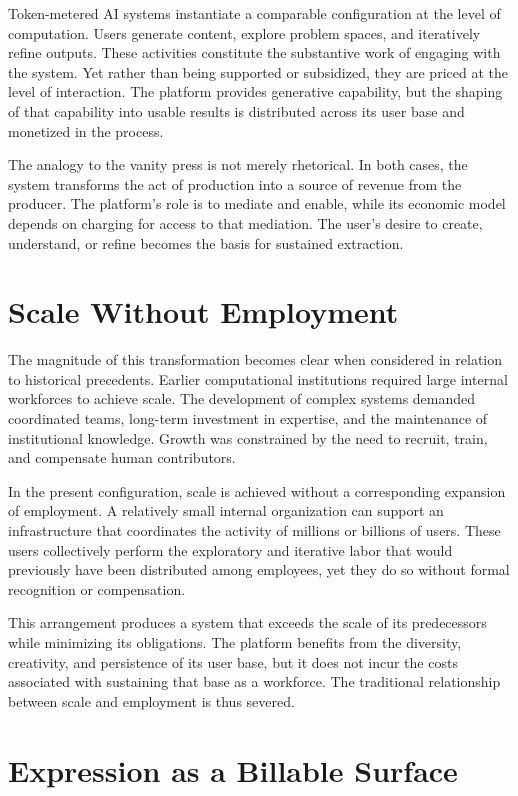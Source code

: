 \documentclass[12pt, oneside]{article}
\begin{document}
Token-metered AI systems instantiate a comparable configuration at the level of computation. Users generate content, explore problem spaces, and iteratively refine outputs. These activities constitute the substantive work of engaging with the system. Yet rather than being supported or subsidized, they are priced at the level of interaction. The platform provides generative capability, but the shaping of that capability into usable results is distributed across its user base and monetized in the process.

The analogy to the vanity press is not merely rhetorical. In both cases, the system transforms the act of production into a source of revenue from the producer. The platform’s role is to mediate and enable, while its economic model depends on charging for access to that mediation. The user’s desire to create, understand, or refine becomes the basis for sustained extraction.

\section{Scale Without Employment}

The magnitude of this transformation becomes clear when considered in relation to historical precedents. Earlier computational institutions required large internal workforces to achieve scale. The development of complex systems demanded coordinated teams, long-term investment in expertise, and the maintenance of institutional knowledge. Growth was constrained by the need to recruit, train, and compensate human contributors.

In the present configuration, scale is achieved without a corresponding expansion of employment. A relatively small internal organization can support an infrastructure that coordinates the activity of millions or billions of users. These users collectively perform the exploratory and iterative labor that would previously have been distributed among employees, yet they do so without formal recognition or compensation.

This arrangement produces a system that exceeds the scale of its predecessors while minimizing its obligations. The platform benefits from the diversity, creativity, and persistence of its user base, but it does not incur the costs associated with sustaining that base as a workforce. The traditional relationship between scale and employment is thus severed.

\section{Expression as a Billable Surface}
\end{document}
